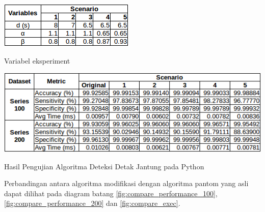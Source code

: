\begin{table}[H]
	\centering
	\includegraphics[scale=0.8]{images/experiment_variable.png}
	\caption{Variabel eksperiment}
	\label{table:experiment_var}
\end{table}

\begin{table}[H]
	\centering
	\includegraphics[scale=0.75]{images/modif_beat_detect.png}	
	\caption{Hasil Pengujian Algoritma Deteksi Detak Jantung pada Python}
	\label{table:exec_time3}
\end{table}

Perbandingan antara algoritma modifikasi dengan algoritma pantom yang asli dapat dilihat pada diagram batang \ref{fig:compare_performance_100}, \ref{fig:compare_performance_200} dan \ref{fig:compare_exec}.


